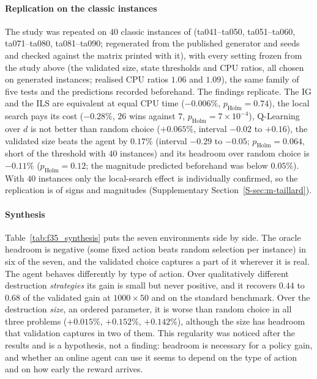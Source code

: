 

\paragraph{Replication on the classic instances}
The study was repeated on $40$ classic instances of \citet{Taillard1993} (ta041--ta050, ta051--ta060, ta071--ta080, ta081--ta090; regenerated from the published generator and seeds and checked against the matrix printed with it),
with every setting frozen from the study above (the validated size, state thresholds and CPU ratios, all chosen on generated instances; realised CPU ratios $1.06$ and $1.09$), the same family of five tests and the predictions recorded beforehand.
The findings replicate. The IG and the ILS are equivalent at equal CPU time ($-0.006\%$, $p_{\mathrm{Holm}}=0.74$), the local search pays its cost ($-0.28\%$, $26$ wins against $7$, $p_{\mathrm{Holm}}=7\times10^{-4}$), Q-Learning over $d$ is not better than random choice
($+0.065\%$, interval $-0.02$ to $+0.16$), the validated size beats the agent by $0.17\%$ (interval $-0.29$ to $-0.05$; $p_{\mathrm{Holm}}=0.064$, short of the threshold with $40$ instances) and its headroom over random choice is $-0.11\%$ ($p_{\mathrm{Holm}}=0.12$; the magnitude predicted beforehand was below $0.05\%$). With $40$ instances only the local-search effect is individually confirmed, so the replication is of signs and magnitudes (Supplementary Section~\ref{S-sec:m-taillard}).

\paragraph{Synthesis}
Table~\ref{tab:f35_synthesis} puts the seven environments side by side. The oracle headroom is negative (some fixed action beats random selection per instance) in six of the seven, and the validated choice
captures a part of it wherever it is real. The agent behaves differently by type of action. Over qualitatively different destruction \emph{strategies} its gain is small but never positive, and it recovers
$0.44$ to $0.68$ of the validated gain at $1000\times50$ and on the standard benchmark. Over the destruction \emph{size}, an ordered parameter, it is worse than random choice in all three problems
($+0.015\%$, $+0.152\%$, $+0.142\%$), although the size has headroom that validation captures in two of them. This regularity was noticed after the results and is a hypothesis, not a finding: headroom is necessary for a
policy gain, and whether an online agent can use it seems to depend on the type of action and on how early the reward arrives.

